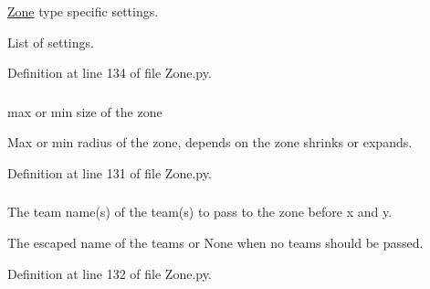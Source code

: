 \hypertarget{class_zone_1_1_zone_a57b65c53ff747cf9504c88ff37d7b9ee}{
\subsubsection[{settings}]{}}
\label{class_zone_1_1_zone_a57b65c53ff747cf9504c88ff37d7b9ee}


\hyperlink{class_zone_1_1_zone}{Zone} type specific settings. 

List of settings. 

Definition at line 134 of file Zone.py.

\hypertarget{class_zone_1_1_zone_a9962b673a138b53b1631158d18cf5279}{
\subsubsection[{target\_\-size}]{}}
\label{class_zone_1_1_zone_a9962b673a138b53b1631158d18cf5279}


max or min size of the zone 

Max or min radius of the zone, depends on the zone shrinks or expands. 

Definition at line 131 of file Zone.py.

\hypertarget{class_zone_1_1_zone_a0f3f8429ae8a37672f700da3f2805a91}{
\subsubsection[{teamnames}]{}}
\label{class_zone_1_1_zone_a0f3f8429ae8a37672f700da3f2805a91}


The team name(s) of the team(s) to pass to the zone before x and y. 

The escaped name of the teams or None when no teams should be passed. 

Definition at line 132 of file Zone.py.

\hypertarget{class_zone_1_1_zone_a2b9ae272876347626e25ead4d48f9a97}{
\subsubsection[{teleport\_\-settings}]{}}
\label{class_zone_1_1_zone_a2b9ae272876347626e25ead4d48f9a97}


